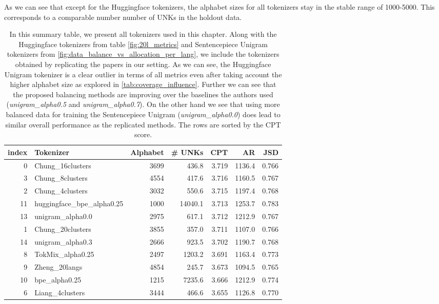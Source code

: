 As we can see that except for the Huggingface tokenizers, the alphabet sizes for all tokenizers stay in the stable range of 1000-5000. This corresponds to a comparable number number of UNKs in the holdout data.


\begin{table}
\caption{In this summary table, we present all tokenizers used in this chapter. Along with the Huggingface tokenizers from table \ref{fig:20l_metrics} and Sentencepiece Unigram tokenizers from \ref{fig:data_balance_vs_allocation_per_lang}, we include the tokenizers obtained by replicating the papers \citet{chung_improving_2020,zheng_allocating_2021,liang_xlm-v_2023} in our setting. As we can see, the Huggingface Unigram tokenizer is a clear outlier in terms of all metrics even after taking account the higher alphabet size as explored in \ref{tab:coverage_influence}. Further we can see that the proposed balancing methods are improving over the baselines the authors used (\textit{unigram\_alpha0.5} and \textit{unigram\_alpha0.7}). On the other hand we see that using more balanced data for training the Sentencepiece Unigram (\textit{unigram\_alpha0.0}) does lead to similar overall performance as the replicated methods.
The rows are sorted by the CPT score.}
\label{tab:all_tokenizers_metrics}
\begin{tabular}{rlrrrrr}
\toprule
index & Tokenizer & Alphabet & \# UNKs & CPT & AR & JSD \\
\midrule
0 & Chung\_16clusters & 3699 & 436.8 & 3.719 & 1136.4 & 0.766 \\
3 & Chung\_8clusters & 4554 & 417.6 & 3.716 & 1160.5 & 0.767 \\
2 & Chung\_4clusters & 3032 & 550.6 & 3.715 & 1197.4 & 0.768 \\
11 & huggingface\_bpe\_alpha0.25 & 1000 & 14040.1 & 3.713 & 1253.7 & 0.783 \\
13 & unigram\_alpha0.0 & 2975 & 617.1 & 3.712 & 1212.9 & 0.767 \\
1 & Chung\_20clusters & 3855 & 357.0 & 3.711 & 1107.0 & 0.766 \\
14 & unigram\_alpha0.3 & 2666 & 923.5 & 3.702 & 1190.7 & 0.768 \\
8 & TokMix\_alpha0.25 & 2497 & 1203.2 & 3.691 & 1163.4 & 0.773 \\
9 & Zheng\_20langs & 4854 & 245.7 & 3.673 & 1094.5 & 0.765 \\
10 & bpe\_alpha0.25 & 1215 & 7235.6 & 3.666 & 1212.9 & 0.774 \\
6 & Liang\_4clusters & 3444 & 466.6 & 3.655 & 1126.8 & 0.770 \\

\end{tabular}
\end{table}
